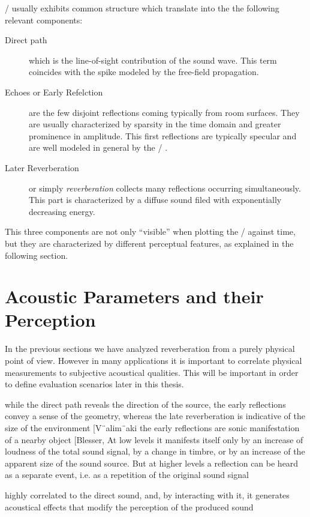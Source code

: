  \RIRs/ usually exhibits common structure which translate into the the following relevant components:

\begin{description}
    \item[Direct path] which is the line-of-sight contribution of the sound wave.
    This term coincides with the spike modeled by the free-field propagation.
    \item[Echoes or Early Refelction] are the few disjoint reflections coming typically from room surfaces.
    They are usually characterized by sparsity in the time domain and greater prominence in amplitude.
    This first reflections are typically specular and are well modeled in general by the \ISM/ \cite{savioja2015overview}.
    \item[Later Reverberation] or simply \textit{reverberation} collects many reflections occurring simultaneously.
    This part is characterized by a diffuse sound filed with exponentially decreasing energy.
\end{description}

This three components are not only ``visible'' when plotting the \RIR/ against time,
but they are characterized by different perceptual features, as explained in the following section.

\section{Acoustic Parameters and their Perception}\label{ch:acoustics:sec:perception}
In the previous sections we have analyzed reverberation from a purely physical point of view.
However in many applications it is important to correlate physical measurements to subjective acoustical qualities.
This will be important in order to define evaluation scenarios later in this thesis.

while the direct path reveals the direction of the source, the early reflections convey a sense of the geometry, whereas the late reverberation is indicative of the size of the environment [V¨alim¨aki
the early reflections are sonic manifestation of a nearby object [Blesser,
At low levels it manifests itself only by an increase of loudness of the total sound signal, by a change in timbre, or by an increase of the apparent size of the sound source. But at higher levels a reflection can be heard as a separate event, i.e. as a repetition of the original sound signal

highly correlated to the direct sound, and, by interacting with it, it generates acoustical effects that modify the perception of the produced sound

